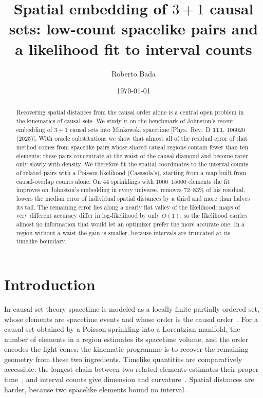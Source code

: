 \documentclass[prd,twocolumn,superscriptaddress,nofootinbib,amsmath,amssymb,floatfix]{revtex4-2}
\begin{document}
\title{Spatial embedding of $3+1$ causal sets: low-count spacelike pairs and a likelihood fit to interval counts}

\author{Roberto Bada}

\date{\today}

\begin{abstract}
Recovering spatial distances from the causal order alone is a central open problem in the kinematics of causal sets. We study it on the benchmark of Johnston's recent embedding of $3+1$ causal sets into Minkowski spacetime [Phys.\ Rev.\ D \textbf{111}, 106020 (2025)]. With oracle substitutions we show that almost all of the residual error of that method comes from spacelike pairs whose shared causal regions contain fewer than ten elements; these pairs concentrate at the waist of the causal diamond and become rarer only slowly with density. We therefore fit the spatial coordinates to the interval counts of related pairs with a Poisson likelihood (Casasola's), starting from a map built from causal-overlap counts alone. On $44$ sprinklings with $1000$--$15000$ elements the fit improves on Johnston's embedding in every universe, removes $72$--$83\%$ of his residual, lowers the median error of individual spatial distances by a third and more than halves its tail. The remaining error lies along a nearly flat valley of the likelihood: maps of very different accuracy differ in log-likelihood by only $O(1)$, so the likelihood carries almost no information that would let an optimizer prefer the more accurate one. In a region without a waist the gain is smaller, because intervals are truncated at its timelike boundary.
\end{abstract}

\maketitle

\section{Introduction}\label{sec:intro}
In causal set theory spacetime is modeled as a locally finite partially ordered set, whose elements are spacetime events and whose order is the causal order~\cite{BLMS87,Surya19}. For a causal set obtained by a Poisson sprinkling into a Lorentzian manifold, the number of elements in a region estimates its spacetime volume, and the order encodes the light cones; the kinematic programme is to recover the remaining geometry from these two ingredients. Timelike quantities are comparatively accessible: the longest chain between two related elements estimates their proper time~\cite{BrightwellGregory91}, and interval counts give dimension and curvature~\cite{GlaserSurya13,RSS13,BD10}. Spatial distances are harder, because two spacelike elements bound no interval.
\end{document}
